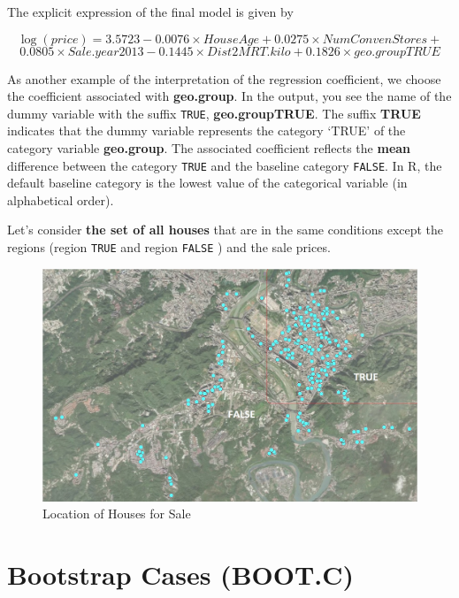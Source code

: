 \documentclass[
]{book}
\begin{document}
The explicit expression of the final model is given by

\[
\log(price) =3.5723 - 0.0076\times HouseAge +0.0275\times NumConvenStores + 
\]
\[   
0.0805\times Sale.year2013 - 0.1445\times Dist2MRT.kilo + 0.1826\times geo.groupTRUE
\]

As another example of the interpretation of the regression coefficient, we choose the coefficient associated with \textbf{geo.group}. In the output, you see the name of the dummy variable with the suffix \texttt{TRUE}, \textbf{geo.groupTRUE}. The suffix \textbf{TRUE} indicates that the dummy variable represents the category `TRUE' of the category variable \textbf{geo.group}. The associated coefficient reflects the \textbf{mean} difference between the category \texttt{TRUE} and the baseline category \texttt{FALSE}. In R, the default baseline category is the lowest value of the categorical variable (in alphabetical order).

Let's consider \textbf{the set of all houses} that are in the same conditions except the regions (region \texttt{TRUE} and region \texttt{FALSE} ) and the sale prices.

\begin{figure}

{\centering \includegraphics[width=0.8\linewidth]{img05/w05-map} 

}

\caption{Location of Houses for Sale}\label{fig:unnamed-chunk-101}
\end{figure}

\hfill\break

\hypertarget{bootstrap-cases-boot.c}{%
\section{Bootstrap Cases (BOOT.C)}\label{bootstrap-cases-boot.c}}
\end{document}
